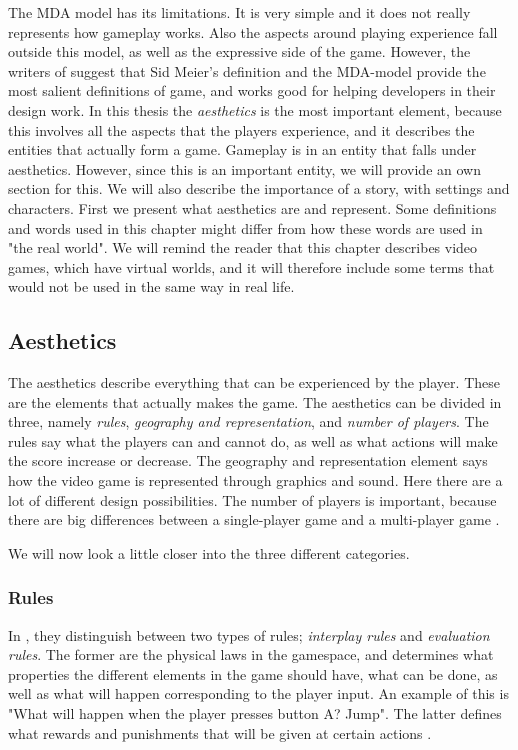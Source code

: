 The MDA model has its limitations. It is very simple and it does not really represents how gameplay works. Also the aspects around playing experience fall outside this model, as well as the expressive side of the game. However, the writers of \cite{understandingvg} suggest that Sid Meier's definition and the MDA-model provide the most salient definitions of game, and works good for helping developers in their design work. In this thesis the \emph{aesthetics} is the most important element, because this involves all the aspects that the players experience, and it describes the entities that actually form a game. Gameplay is in \cite{understandingvg} an entity that falls under aesthetics. However, since this is an important entity, we will provide an own section for this. We will also describe the importance of a story, with settings and characters. First we present what aesthetics are and represent. Some definitions and words used in this chapter might differ from how these words are used in "the real world". We will remind the reader that this chapter describes video games, which have virtual worlds, and it will therefore include some terms that would not be used in the same way in real life.    


\subsection{Aesthetics}
The aesthetics describe everything that can be experienced by the player. These are the elements that actually makes the game. The aesthetics can be divided in three, namely \emph{rules}, \emph{geography and representation}, and \emph{number of players}. The rules say what the players can and cannot do, as well as what actions will make the score increase or decrease. The geography and representation element says how the video game is represented through graphics and sound. Here there are a lot of different design possibilities. The number of players is important, because there are big differences between a single-player game and a multi-player game \cite{understandingvg}.

We will now look a little closer into the three different categories.

\subsubsection{Rules}
In \cite{understandingvg}, they distinguish between two types of rules; \emph{interplay rules} and \emph{evaluation rules}. The former are the physical laws in the gamespace, and determines what properties the different elements in the game should have, what can be done, as well as what will happen corresponding to the player input. An example of this is "What will happen when the player presses button A? Jump". The latter defines what rewards and punishments that will be given at certain actions \cite{understandingvg}. 

